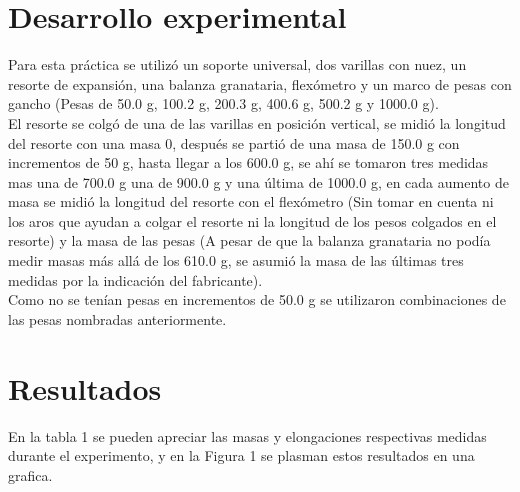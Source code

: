 \documentclass[12pt,a4paper]{article}
\begin{document}
\section{Desarrollo experimental}

Para esta práctica se utilizó un soporte universal, dos varillas con nuez, un resorte de expansión, una balanza granataria, flexómetro y un marco de pesas con gancho (Pesas de 50.0 g, 100.2 g, 200.3 g, 400.6 g, 500.2 g y 1000.0 g). \\

El resorte se colgó de una de las varillas en posición vertical, se midió la longitud del resorte con una masa 0, después se partió de una masa de 150.0 g con incrementos de 50 g, hasta llegar a los 600.0 g, se ahí se tomaron tres medidas mas una de 700.0 g una de 900.0 g y una última de 1000.0 g, en cada aumento de masa se midió la longitud del resorte con el flexómetro (Sin tomar en cuenta ni los aros que ayudan a colgar el resorte ni la longitud de los pesos colgados en el resorte) y la masa de las pesas (A pesar de que la balanza granataria no podía medir masas más allá de los 610.0 g, se asumió la masa de las últimas tres medidas por la indicación del fabricante).\\ 

Como no se tenían pesas en incrementos de 50.0 g se utilizaron combinaciones de las pesas nombradas anteriormente. \\

\section{Resultados}

En la tabla 1 se pueden apreciar las masas y elongaciones respectivas medidas durante el experimento, y en la Figura 1 se plasman estos resultados en una grafica.\\
\end{document}
